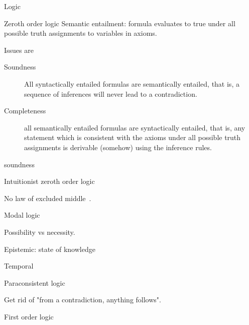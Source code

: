 \begin{plSection}{Logic}
\begin{plSection}{Zeroth order logic}
Semantic entailment: formula evaluates to \textsf{true}
under all possible truth assignments to variables
in axioms.

Issues are 
\begin{description}
\item[Soundness]
All syntactically entailed formulas
are semantically entailed, that is,
a sequence of inferences will never lead to a contradiction.

\item[Completeness] 
all semantically entailed formulas 
are syntactically entailed, that is,
any statement which is consistent with the axioms under all 
possible truth assignments is derivable (somehow) using the 
inference rules.
\end{description}soundness 

\begin{plSection}{Intuitionist zeroth order logic}
\label{sec:Intuitionist_zeroth_order_logic}

\cite{wiki:IntuitionisticLogic}

No law of excluded middle~\cite{wiki:LawOfExcludedMiddle}.

\end{plSection}%
\end{plSection}%
\begin{plSection}{Modal logic}
\label{sec:Modal_logic}

\cite{wiki:ModalLogic}

Possibility vs necessity.

Epistemic: state of knowledge

Temporal 

\end{plSection}%
\begin{plSection}{Paraconsistent logic}
\label{sec:Paraconsistent_logic}

\cite{wiki:Paraconsistent_logic}

Get rid of "from a contradiction, anything follows".
\end{plSection}%
\begin{plSection}{First order logic}
\label{sec:First_order_logic}


\end{plSection}
\end{plSection}
